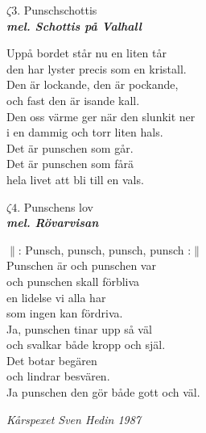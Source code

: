 \documentclass[a6paper,10pt]{article}
\newcommand{\mel}[1]{\small\textbf{\textit{mel. #1 \\}}}
\begin{document}
\setlength{\oddsidemargin}{-0.37in}
\noindent
\begin{center}
\Large $\zeta3$. Punschschottis \\ 
\mel{Schottis på Valhall}
\end{center}
Uppå bordet står nu en liten tår\\
den har lyster precis som en kristall.\\
Den är lockande, den är pockande,\\
och fast den är isande kall.\\
Den oss värme ger när den slunkit ner\\
i en dammig och torr liten hals.\\
Det är punschen som går.\\
Det är punschen som fårä\\
hela livet att bli till en vals.
\vspace{40pt}
\begin{center}
\Large $\zeta4$. Punschens lov \\ 
\mel{Rövarvisan}
\end{center}
$\|$: Punsch, punsch, punsch, punsch :$\|$
\vspace{5pt}\\
Punschen är och punschen var\\
och punschen skall förbliva\\
en lidelse vi alla har\\
som ingen kan fördriva.
\vspace{5pt}\\
Ja, punschen tinar upp så väl\\
och svalkar både kropp och själ.\\
Det botar begären\\
och lindrar besvären.\\
Ja punschen den gör både gott och väl.
\begin{flushright}
\textit{Kårspexet Sven Hedin 1987}
\end{flushright}
\end{document}
